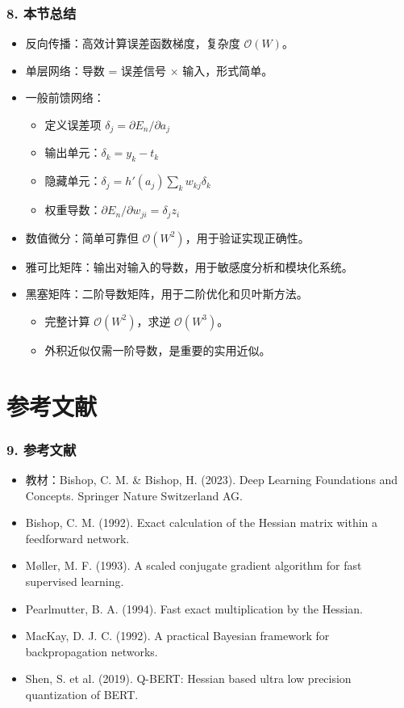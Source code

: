 \documentclass[t,aspectratio=169]{beamer} %
\begin{document}
\begin{frame}
    \frametitle{8. 本节总结}
    \begin{itemize}
        \item \alert{反向传播}：高效计算误差函数梯度，复杂度 $\mathcal{O}(W)$。
        \item \alert{单层网络}：导数 = 误差信号 × 输入，形式简单。
        \item \alert{一般前馈网络}：
        \begin{itemize}
            \item 定义误差项 $\delta_j = \partial E_n / \partial a_j$
            \item 输出单元：$\delta_k = y_k - t_k$
            \item 隐藏单元：$\delta_j = h'(a_j) \sum_k w_{kj} \delta_k$
            \item 权重导数：$\partial E_n / \partial w_{ji} = \delta_j z_i$
        \end{itemize}
        \item \alert{数值微分}：简单可靠但 $\mathcal{O}(W^2)$，用于验证实现正确性。
        \item \alert{雅可比矩阵}：输出对输入的导数，用于敏感度分析和模块化系统。
        \item \alert{黑塞矩阵}：二阶导数矩阵，用于二阶优化和贝叶斯方法。
        \begin{itemize}
            \item 完整计算 $\mathcal{O}(W^2)$，求逆 $\mathcal{O}(W^3)$。
            \item 外积近似仅需一阶导数，是重要的实用近似。
        \end{itemize}
    \end{itemize}
\end{frame}

\section{参考文献}

\begin{frame}
    \frametitle{9. 参考文献}
    \begin{itemize}
        \item 教材：Bishop, C. M. \& Bishop, H. (2023). Deep Learning Foundations and Concepts. Springer Nature Switzerland AG.
        \item Bishop, C. M. (1992). Exact calculation of the Hessian matrix within a feedforward network.
        \item Møller, M. F. (1993). A scaled conjugate gradient algorithm for fast supervised learning.
        \item Pearlmutter, B. A. (1994). Fast exact multiplication by the Hessian.
        \item MacKay, D. J. C. (1992). A practical Bayesian framework for backpropagation networks.
        \item Shen, S. et al. (2019). Q-BERT: Hessian based ultra low precision quantization of BERT.
    \end{itemize}
\end{frame}
\end{document}
